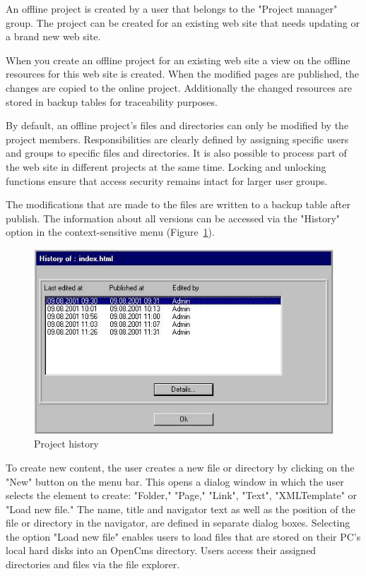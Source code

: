 An offline project is created by a user that belongs to the
"Project manager" group. The project can be created for an
existing web site that needs updating or a brand new web site.

When you create an offline project for an existing web site a view
on the offline resources for this web site is created. When the
modified pages are published, the changes are copied to the online
project. Additionally the changed resources are stored in backup
tables for traceability purposes.

By default, an offline project's files and directories can only be
modified by the project members. Responsibilities are clearly
defined by assigning specific users and groups to specific files
and directories. It is also possible to process part of the web
site in different projects at the same time. Locking and unlocking
functions ensure that access security remains intact for larger
user groups.

The modifications that are made to the files are written to a
backup table after publish. The information about all versions can
be accessed via the "History" option in the context-sensitive menu
(Figure~\ref{history01}).

\begin{figure}[hbt]
\begin{center}
\includegraphics[width=\sgw]
                   {pics/usermanual/history01}
\caption[Project history]
           {Project history}
\label{history01}
\end{center}
\end{figure}

To create new content, the user creates a new file or directory by
clicking on the "New" button on the menu bar. This opens a dialog
window in which the user selects the element to create: "Folder,"
"Page," "Link", "Text", "XMLTemplate" or "Load new file." The
name, title and navigator text as well as the position of the file
or directory in the navigator, are defined in separate dialog
boxes. Selecting the option "Load new file" enables users to load
files that are stored on their PC's local hard disks into an
OpenCms directory. Users access their assigned directories and
files via the file explorer.

